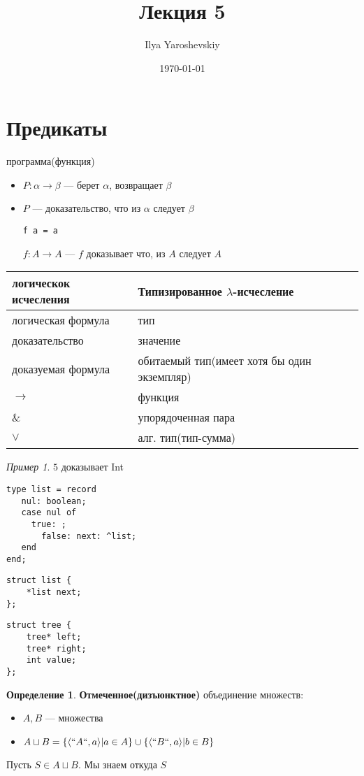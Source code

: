 \documentclass[english]{article}
\author{Ilya Yaroshevskiy}
\date{\today}
\title{Лекция 5}
\theoremstyle{plain}
\theoremstyle{remark}
\newtheorem*{examp}{Пример}
\theoremstyle{definition}
\newtheorem*{definition}{Определение}
\begin{document}
\maketitle
\tableofcontents


\section{Предикаты}
\label{sec:org871375a}
программа(функция)
\begin{itemize}
\item \(P: \alpha \to \beta\) --- берет \(\alpha\), возвращает \(\beta\)
\item \(P\) --- доказательство, что из \(\alpha\) следует \(\beta\)
\begin{verbatim}
f a = a
\end{verbatim}
\(f: A \to A\) --- \(f\) доказывает что, из \(A\) следует \(A\)
\end{itemize}
\begin{center}
\begin{tabular}{ll}
логическок исчесления & Типизированное \(\lambda\)-исчесление\\
\hline
логическая формула & тип\\
доказательство & значение\\
доказуемая формула & обитаемый тип(имеет хотя бы один экземпляр)\\
\(\to\) & функция\\
\& & упорядоченная пара\\
\(\vee\) & алг. тип(тип-сумма)\\
\end{tabular}
\end{center}
\begin{examp}
\(5\) доказывает Int
\end{examp}
\begin{verbatim}
type list = record
   nul: boolean;
   case nul of
     true: ;
	   false: next: ^list;
   end
end;
\end{verbatim}
\begin{verbatim}
struct list {
	*list next;
};
\end{verbatim}
\begin{verbatim}
struct tree {
	tree* left;
	tree* right;
	int value;
};
\end{verbatim}
\begin{definition}
\textbf{Отмеченное(дизъюнктное)} объединение множеств: \\
\begin{itemize}
\item \(A, B\) --- множества
\item \(A \sqcup B = \{\langle ``A``, a \rangle| a\in A\}\cup\{\langle ``B``, a \rangle | b \in B\}\)
\end{itemize}
Пусть \(S \in A \sqcup B\). Мы знаем откуда \(S\)
\end{definition}
\end{document}

